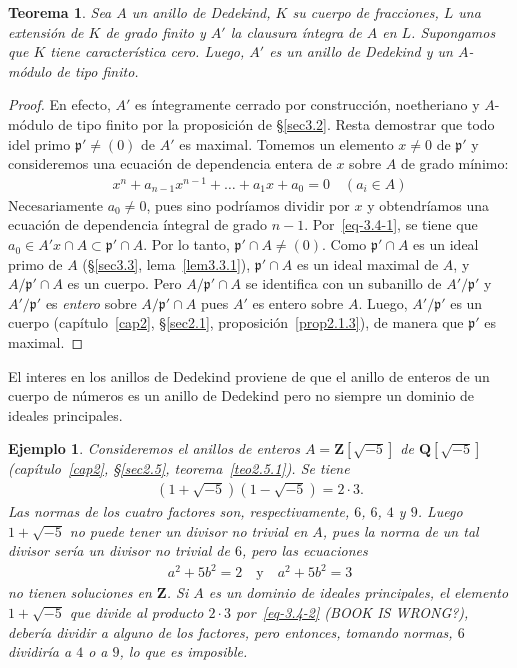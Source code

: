 \documentclass[10pt,oneside,bibtotoc,smallheadings,leqno,a5paper,DIV=12]{scrbook}
\newcommand{\QQ}{\mathbf{Q}}
\newcommand{\ZZ}{\mathbf{Z}}
\newcommand{\idl}[1]{\mathfrak{#1}}
\newcommand{\QED}{}%
\numberwithin{equation}{section}
\theoremstyle{defi}
\theoremstyle{enonce}
\newtheorem{theorem}{Teorema}
\theoremstyle{rem}
\newtheorem*{example*}{Ejemplo}
\numberwithin{theorem}{section}
\numberwithin{proposition}{section}
\numberwithin{definition}{section}
\numberwithin{lemma}{section}
\numberwithin{corollary}{section}
\numberwithin{example}{section}
\numberwithin{footnote}{section}%
\begin{document}
\begin{theorem}\label{teo3.4.1}
Sea $A$ un anillo de Dedekind, $K$ su cuerpo de fracciones, $L$ una extensi\'on de $K$ de grado finito y
$A'$ la clausura \'integra de $A$ en $L$. Supongamos que $K$ tiene caracter\'istica cero. Luego,
$A'$ es un anillo de Dedekind y un $A$-m\'odulo de tipo finito.
\end{theorem}

\begin{proof}
En efecto, $A'$ es \'integramente cerrado por construcci\'on, noetheriano y $A$-m\'odulo de tipo finito
por la proposici\'on de \S\ref{sec3.2}. Resta demostrar que todo idel primo $\idl{p}'\neq(0)$ de $A'$ es maximal. Tomemos
un elemento $x\neq 0$ de $\idl{p}'$ y consideremos una ecuaci\'on de dependencia entera de $x$ sobre $A$ de
grado m\'inimo:
\begin{gather}\label{eq-3.4-1}
x^{n}+a_{n-1}x^{n-1}+\dots+a_{1}x+a_{0} = 0\quad(a_{i}\in A)
\end{gather}
Necesariamente $a_{0}\neq 0$, pues sino podr\'iamos dividir por $x$ y obtendr\'iamos una ecuaci\'on de dependencia
\'integral de grado $n-1$. Por~\eqref{eq-3.4-1}, se tiene que $a_{0}\in A'x\cap A\subset\idl{p}'\cap A$. Por lo tanto,
$\idl{p}'\cap A\neq(0)$. Como $\idl{p}'\cap A$ es un ideal primo de $A$ (\S\ref{sec3.3}, lema~\ref{lem3.3.1}), $\idl{p}'\cap A$
es un ideal maximal de $A$, y $A/\idl{p'}\cap A$ es un cuerpo. Pero $A/\idl{p}'\cap A$ se identifica con un
subanillo de $A'/\idl{p}'$ y $A'/\idl{p'}$ es {\em entero} sobre $A/\idl{p}'\cap A$ pues $A'$ es entero
sobre $A$. Luego, $A'/\idl{p}'$ es un cuerpo (cap\'itulo~\ref{cap2}, \S\ref{sec2.1}, proposici\'on~\ref{prop2.1.3}), de manera que $\idl{p}'$
es maximal. \QED
\end{proof}

El interes en los anillos de Dedekind proviene de que el anillo de enteros de un cuerpo de n\'umeros es un
anillo de Dedekind pero no siempre un dominio de ideales principales.

\begin{example*}
Consideremos el anillos de enteros $A = \ZZ[\sqrt{-5}]$ de $\QQ[\sqrt{-5}]$
(cap\'itulo~\ref{cap2}, \S\ref{sec2.5}, teorema~\ref{teo2.5.1}). Se tiene
\begin{gather}\label{eq-3.4-2}
(1+\sqrt{-5})(1-\sqrt{-5}) = 2\cdot 3.
\end{gather}
Las normas de los cuatro factores son, respectivamente, $6$, $6$, $4$ y $9$. Luego
$1+\sqrt{-5}$ no puede tener un divisor no trivial en $A$, pues la norma de un tal divisor
ser\'ia un divisor no trivial de $6$, pero las ecuaciones
\begin{gather*}
a^{2}+5b^{2}=2\quad\text{y}\quad a^{2}+5b^{2}=3
\end{gather*}
no tienen soluciones en $\ZZ$. Si $A$ es un dominio de ideales principales, el elemento $1+\sqrt{-5}$
que divide al producto $2\cdot 3$ por~\eqref{eq-3.4-2} (BOOK IS WRONG?), deber\'ia dividir a alguno de los factores, pero entonces,
tomando normas, $6$ dividir\'ia a $4$ o a $9$, lo que es imposible.
\end{example*}
\end{document}
